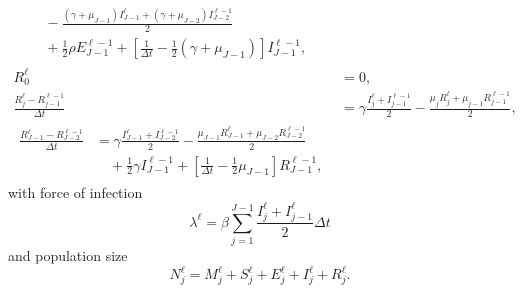 \documentclass{jpmarticle}
\let\subequationsorig\subequations%
\let\endsubequationsorig\endsubequations%
\renewenvironment{subequations}{
  \subequationsorig
  \renewcommand{\theequation}{\theparentequation.\arabic{equation}}
}{
  \endsubequationsorig
}
\begin{document}
\begin{subequations}
\begin{align}
\begin{split}
      \\ & \quad {}
      - \frac{(\gamma + \mu_{J - 1}) I_{J - 1}^{\ell}
        + (\gamma + \mu_{J - 2}) I_{J - 2}^{\ell - 1}}{2}
      \\ & \quad {}
      + \frac{1}{2} \rho E_{J - 1}^{\ell - 1}
      + \left[\frac{1}{\Delta t}
        - \frac{1}{2} (\gamma + \mu_{J - 1})\right]
      I_{J - 1}^{\ell - 1},
    \end{split}
    \\
    R_0^{\ell} &= 0,
    \\
    \frac{R_j^{\ell} - R_{j - 1}^{\ell - 1}}{\Delta t} &=
    \gamma \frac{I_j^{\ell} + I_{j - 1}^{\ell - 1}}{2}
    - \frac{\mu_j R_j^{\ell} + \mu_{j - 1} R_{j - 1}^{\ell - 1}}{2},
    \\
    \begin{split}
      \frac{R_{J - 1}^{\ell} - R_{J - 2}^{\ell - 1}}{\Delta t} &=
      \gamma \frac{I_{J - 1}^{\ell} + I_{J - 2}^{\ell - 1}}{2}
      - \frac{\mu_{J - 1} R_{J - 1}^{\ell}
        + \mu_{J - 2} R_{J - 2}^{\ell - 1}}{2}
      \\ & \quad {}
      + \frac{1}{2} \gamma I_{J - 1}^{\ell - 1}
      + \left[\frac{1}{\Delta t} - \frac{1}{2} \mu_{J - 1}\right]
      R_{J - 1}^{\ell - 1},
    \end{split}
  \end{align}
  with force of infection
  \begin{equation}
    \lambda^{\ell} =
    \beta \sum_{j = 1}^{J - 1}
    \frac{I_j^{\ell} + I_{j - 1}^{\ell}}{2}
    \Delta t
  \end{equation}
  and population size
  \begin{equation}
    N_j^{\ell} =
    M_j^{\ell} + S_j^{\ell} + E_j^{\ell} + I_j^{\ell} + R_j^{\ell}.
  \end{equation}
\end{subequations}
\end{document}
